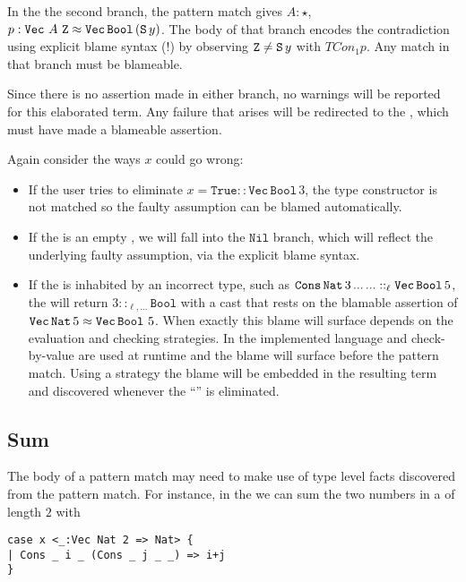 In the the second branch, the pattern match gives $A:\star$, $p:\mathtt{Vec}\ A\ \mathtt{Z}\approx\mathtt{Vec}\,\mathtt{Bool}\,(\Suc{}\,y)$.
The body of that branch encodes the contradiction using explicit blame syntax ($!$) by observing $\mathtt{Z}\neq\mathtt{S}{}\,y$ with $TCon_{1}p$.
Any match in that branch must be blameable.
 
Since there is no assertion made in either branch, no warnings will be reported for this elaborated \case{} term.
Any failure that arises will be redirected to the \scrut{}, which must have made a blameable assertion.
 
Again consider the ways $x$ could go wrong:
\begin{itemize}
\item
If the user tries to eliminate $x=\mathtt{True}::\mathtt{Vec}\,\mathtt{Bool}\,3$, the type constructor is not matched so the faulty assumption can be blamed automatically.
\item
If the \scrut{} is an empty \Vect{}, we will fall into the $\mathtt{Nil}$ branch, which will reflect the underlying faulty assumption, via the explicit blame syntax.
\item
If the \Vect{} is inhabited by an incorrect type, such as $\mathtt{Cons}\,\mathtt{Nat}{}\,3\,...\,...::_{\ell}\mathtt{Vec}\,\mathtt{Bool}\,5$, the \case{} will return $3::_{\ell,...}\mathtt{Bool}$ with a cast that rests on the blamable assertion of $\mathtt{Vec}\,\mathtt{Nat}{}\,5\approx\mathtt{Vec}\,\mathtt{Bool}\,\,5$.
When exactly this blame will surface depends on the evaluation and checking strategies.
In the implemented language \cbv{} and check-by-value are used at runtime and the blame will surface before the pattern match.
Using a \whnf{} strategy the blame will be embedded in the resulting term and discovered whenever the ``\Bool{}'' is eliminated. %
\end{itemize}
 
\subsection{Sum}
 
The body of a pattern match may need to make use of type level facts discovered from the pattern match.
For instance, in the \slang{} we can  sum the two numbers in a \Vect{} of length $2$ with
 
\begin{lstlisting}[basicstyle={\ttfamily\small}]
case x <_:Vec Nat 2 => Nat> {
| Cons _ i _ (Cons _ j _ _) => i+j
}
\end{lstlisting}
 
